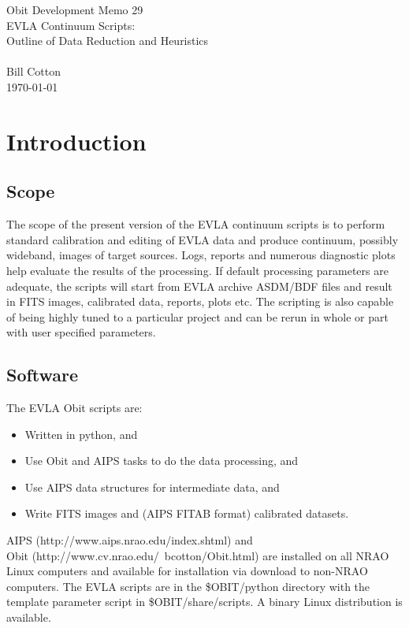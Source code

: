 \documentclass[11pt]{article}
\begin{document}
{
\begin{center}
{\Large Obit Development Memo 29\\ }
{\Large EVLA Continuum Scripts: \\
Outline of Data Reduction and Heuristics} \\
~ \\
Bill Cotton \\
\today
\end{center}}

\section{Introduction}



\subsection{Scope}

The scope of the present version of the EVLA continuum scripts is to
perform standard calibration and editing of EVLA data and produce
continuum, possibly wideband, images of target sources.
Logs, reports and numerous diagnostic plots help evaluate the results
of the processing.
If default processing parameters are adequate, the scripts will start
from EVLA archive ASDM/BDF files and result in FITS images,
calibrated data, reports, plots etc.
The scripting is also capable of being highly tuned to a particular
project and can be rerun in whole or part with user specified
parameters.

\subsection{Software}

The EVLA Obit scripts are:

\begin{itemize}
\item Written in python, and
\item Use Obit and AIPS tasks to do the data processing, and
\item Use AIPS data structures for intermediate data, and
\item Write FITS images and (AIPS FITAB format) calibrated datasets.
\end{itemize}

AIPS (http://www.aips.nrao.edu/index.shtml) and\\
Obit (http://www.cv.nrao.edu/~bcotton/Obit.html)
are installed on all NRAO Linux computers and available for 
installation via download to non-NRAO computers.
The EVLA scripts are in the \$OBIT/python directory with the template
parameter script in \$OBIT/share/scripts.
A binary Linux distribution is available.
\end{document}
